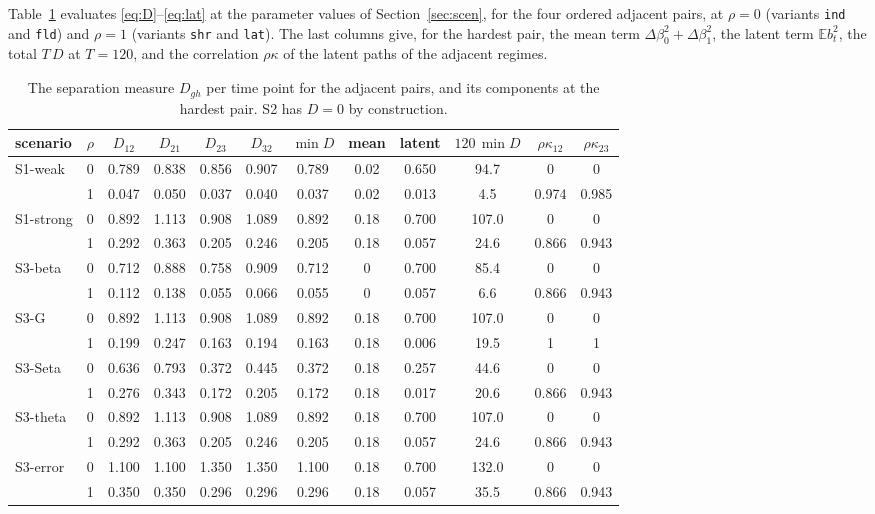 \documentclass[11pt]{article}
\newcommand{\E}{\mathbb{E}}
\begin{document}
Table~\ref{tab:sep} evaluates \eqref{eq:D}--\eqref{eq:lat} at the parameter values of Section~\ref{sec:scen}, for the four ordered adjacent pairs, at $\rho = 0$ (variants \texttt{ind} and \texttt{fld}) and $\rho = 1$ (variants \texttt{shr} and \texttt{lat}). The last columns give, for the hardest pair, the mean term $\Delta\beta_0^2 + \Delta\beta_1^2$, the latent term $\E b_t^2$, the total $T\,D$ at $T = 120$, and the correlation $\rho\kappa$ of the latent paths of the adjacent regimes.

\begin{table}[ht]
\centering
\small
\setlength{\tabcolsep}{4.5pt}
\caption{The separation measure $D_{gh}$ per time point for the adjacent pairs, and its components at the hardest pair. S2 has $D = 0$ by construction.}\label{tab:sep}
\begin{tabular}{lc cccc c cc c cc}
\toprule
scenario & $\rho$ & $D_{12}$ & $D_{21}$ & $D_{23}$ & $D_{32}$ & $\min D$ & mean & latent & $120\,\min D$ & $\rho\kappa_{12}$ & $\rho\kappa_{23}$ \\
\midrule
S1-weak   & 0 & 0.789 & 0.838 & 0.856 & 0.907 & 0.789 & 0.02 & 0.650 & 94.7  & 0     & 0     \\
          & 1 & 0.047 & 0.050 & 0.037 & 0.040 & 0.037 & 0.02 & 0.013 & 4.5   & 0.974 & 0.985 \\
S1-strong & 0 & 0.892 & 1.113 & 0.908 & 1.089 & 0.892 & 0.18 & 0.700 & 107.0 & 0     & 0     \\
          & 1 & 0.292 & 0.363 & 0.205 & 0.246 & 0.205 & 0.18 & 0.057 & 24.6  & 0.866 & 0.943 \\
S3-beta   & 0 & 0.712 & 0.888 & 0.758 & 0.909 & 0.712 & 0    & 0.700 & 85.4  & 0     & 0     \\
          & 1 & 0.112 & 0.138 & 0.055 & 0.066 & 0.055 & 0    & 0.057 & 6.6   & 0.866 & 0.943 \\
S3-G      & 0 & 0.892 & 1.113 & 0.908 & 1.089 & 0.892 & 0.18 & 0.700 & 107.0 & 0     & 0     \\
          & 1 & 0.199 & 0.247 & 0.163 & 0.194 & 0.163 & 0.18 & 0.006 & 19.5  & 1     & 1     \\
S3-Seta   & 0 & 0.636 & 0.793 & 0.372 & 0.445 & 0.372 & 0.18 & 0.257 & 44.6  & 0     & 0     \\
          & 1 & 0.276 & 0.343 & 0.172 & 0.205 & 0.172 & 0.18 & 0.017 & 20.6  & 0.866 & 0.943 \\
S3-theta  & 0 & 0.892 & 1.113 & 0.908 & 1.089 & 0.892 & 0.18 & 0.700 & 107.0 & 0     & 0     \\
          & 1 & 0.292 & 0.363 & 0.205 & 0.246 & 0.205 & 0.18 & 0.057 & 24.6  & 0.866 & 0.943 \\
S3-error  & 0 & 1.100 & 1.100 & 1.350 & 1.350 & 1.100 & 0.18 & 0.700 & 132.0 & 0     & 0     \\
          & 1 & 0.350 & 0.350 & 0.296 & 0.296 & 0.296 & 0.18 & 0.057 & 35.5  & 0.866 & 0.943 \\
\bottomrule
\end{tabular}
\end{table}
\end{document}
